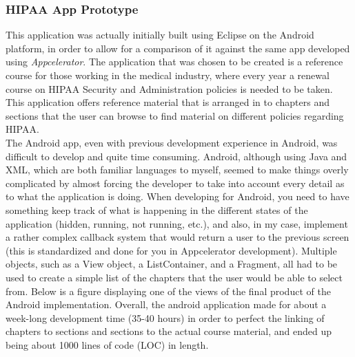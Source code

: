 \documentclass[11pt, twocolumn]{article}
\begin{document}
\subsubsection{HIPAA App Prototype}
This application was actually initially built using Eclipse on the Android platform, in order to allow for a comparison of it against the same app developed using {\it Appcelerator}.  The application that was chosen to be created is a reference course for those working in the medical industry, where every year a renewal course on HIPAA Security and Administration policies is needed to be taken.  This application offers reference material that is arranged in to chapters and sections that the user can browse to find material on different policies regarding HIPAA.\\

The Android app, even with previous development experience in Android, was difficult to develop and quite time consuming.  Android, although using Java and XML, which are both familiar languages to myself, seemed to make things overly complicated by almost forcing the developer to take into account every detail as to what the application is doing.  When developing for Android, you need to have something keep track of what is happening in the different states of the application (hidden, running, not running, etc.), and also, in my case, implement a rather complex callback system that would return a user to the previous screen (this is standardized and done for you in Appcelerator development).  Multiple objects, such as a View object, a ListContainer, and a Fragment, all had to be used to create a simple list of the chapters that the user would be able to select from. Below is a figure displaying one of the views of the final product of the Android implementation. Overall, the android application made for about a week-long development time (35-40 hours) in order to perfect the linking of chapters to sections and sections to the actual course material, and ended up being about 1000 lines of code (LOC) in length.\\
\end{document}
